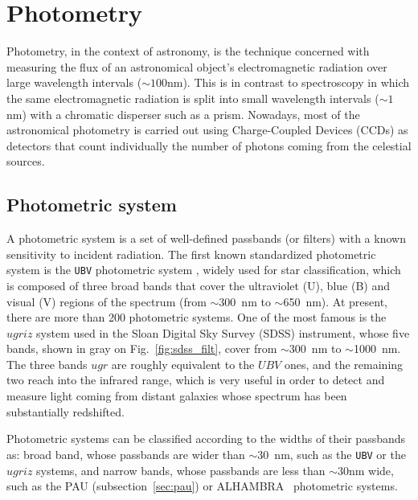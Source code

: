 \section{Photometry}
\label{sec:photometry}
Photometry, in the context of astronomy, is the technique concerned with measuring the flux of an astronomical object's electromagnetic radiation over large wavelength intervals ($\sim100$nm). This is in contrast to spectroscopy in which the same electromagnetic radiation is split into small wavelength intervals ($\sim1$nm) with a chromatic disperser such as a prism. Nowadays, most of the astronomical photometry is carried out using Charge-Coupled Devices (CCDs) as detectors that count individually the number of photons coming from the celestial sources.

\subsection{Photometric system}
A photometric system is a set of well-defined passbands (or filters) with a known sensitivity to incident radiation. The first known standardized photometric system is the \texttt{UBV} photometric system \citep{Johnson1953}, widely used for star classification, which is composed of three broad bands that cover the ultraviolet (U), blue (B) and visual (V) regions of the spectrum (from $\sim$300~nm to $\sim$650~nm). At present, there are more than 200 photometric systems. One of the most famous is the $ugriz$ system \citep{Fukugita1996} used in the Sloan Digital Sky Survey (SDSS) instrument, whose five bands, shown in gray on Fig.~\ref{fig:sdss_filt}, cover from $\sim$300~nm to $\sim$1000~nm. The three bands $ugr$ are roughly equivalent to the $UBV$ ones, and the remaining two reach into the infrared range, which is very useful in order to detect and measure light coming from distant galaxies whose spectrum has been substantially redshifted.

Photometric systems can be classified according to the widths of their passbands as: broad band, whose passbands are wider than $\sim30$~nm, such as the \texttt{UBV} or the $ugriz$ systems, and narrow bands, whose passbands are less than $\sim30$nm wide, such as the PAU (subsection~\ref{sec:pau}) or ALHAMBRA~\citep{Moles2008} photometric systems.

